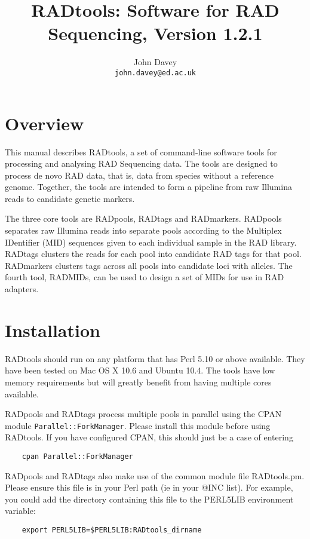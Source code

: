 \documentclass[a4paper]{article}
\title{RADtools: Software for RAD Sequencing, Version 1.2.1}
\author{John Davey\\{\tt john.davey@ed.ac.uk}}
\begin{document}
\maketitle

\section{Overview}

This manual describes RADtools, a set of command-line software tools for processing and analysing RAD Sequencing data. The tools are designed to process de novo RAD data, that is, data from species without a reference genome. Together, the tools are intended to form a pipeline from raw Illumina reads to candidate genetic markers.

The three core tools are RADpools, RADtags and RADmarkers. RADpools separates raw Illumina reads into separate pools according to the Multiplex IDentifier (MID) sequences given to each individual sample in the RAD library. RADtags clusters the reads for each pool into candidate RAD tags for that pool. RADmarkers clusters tags across all pools into candidate loci with alleles. The fourth tool, RADMIDs, can be used to design a set of MIDs for use in RAD adapters.


\section{Installation}

RADtools should run on any platform that has Perl 5.10 or above available. They have been tested on Mac OS X 10.6 and Ubuntu 10.4. The tools have low memory requirements but will greatly benefit from having multiple cores available.

RADpools and RADtags process multiple pools in parallel using the CPAN module \verb|Parallel::ForkManager|. Please install this module before using RADtools. If you have configured CPAN, this should just be a case of entering

\begin{verbatim}
    cpan Parallel::ForkManager
\end{verbatim}

RADpools and RADtags also make use of the common module file RADtools.pm. Please ensure this file is in your Perl path (ie in your @INC list). For example, you could add the directory containing this file to the PERL5LIB environment variable:

\begin{verbatim}
    export PERL5LIB=$PERL5LIB:RADtools_dirname
\end{verbatim}
\end{document}
